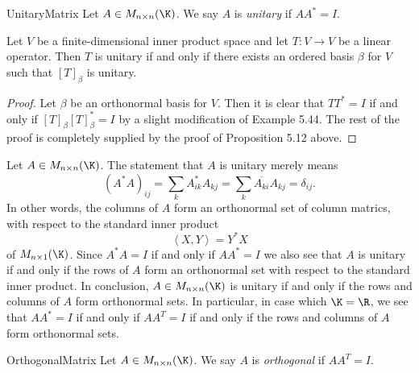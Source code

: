 \documentclass[linearalgebraII]{subfiles}
\begin{document}
    \begin{definition}{Unitary}{Matrix}
        Let $A\in M_{n\times n}(\K)$. We say $A$ is \emph{unitary} if $AA^*=I$.
    \end{definition}

    \begin{prop}{}
        Let $V$ be a finite-dimensional inner product space and let $T:V\to V$ be a linear operator. Then $T$ is unitary if and only if there exists an ordered basis $\beta$ for $V$ such that $\left[ T \right] _\beta$ is unitary.
    \end{prop}

    \begin{proof}
        Let $\beta$ be an orthonormal basis for $V$. Then it is clear that $TT^*=I$ if and only if $\left[ T \right] _\beta\left[ T \right] _\beta^* = I$ by a slight modification of Example 5.44. The rest of the proof is completely supplied by the proof of Proposition 5.12 above.
    \end{proof}

    \begin{remark}
        Let $A\in M_{n\times n}(\K)$. The statement that $A$ is unitary merely means
        \begin{equation*}
            \left( A^*A \right) _{ij} = \sum^{}_{k} A^*_{ik}A_{kj} = \sum^{}_{k} \overline{A_{ki}} A_{kj} = \delta_{ij}.
        \end{equation*}
        In other words, the columns of $A$ form an orthonormal set of column matrics, with respect to the standard inner product
        \begin{equation*}
            \left\langle X, Y\right\rangle = Y^*X
        \end{equation*}
        of $M_{n\times 1}(\K)$. Since $A^*A=I$ if and only if $AA^*=I$ we also see that $A$ is unitary if and only if the rows of $A$ form an orthonormal set with respect to the standard inner product. In conclusion, $A\in M_{n\times n}(\K)$ is unitary if and only if the rows and columns of $A$ form orthonormal sets. In particular, in case which $\K=\R$, we see that $AA^*=I$ if and only if $AA^T=I$ if and only if the rows and columns of $A$ form orthonormal sets.
    \end{remark}

    \begin{definition}{Orthogonal}{Matrix}
        Let $A\in M_{n\times n}(\K)$. We say $A$ is \emph{orthogonal} if $AA^T=I$.
    \end{definition}
\end{document}
